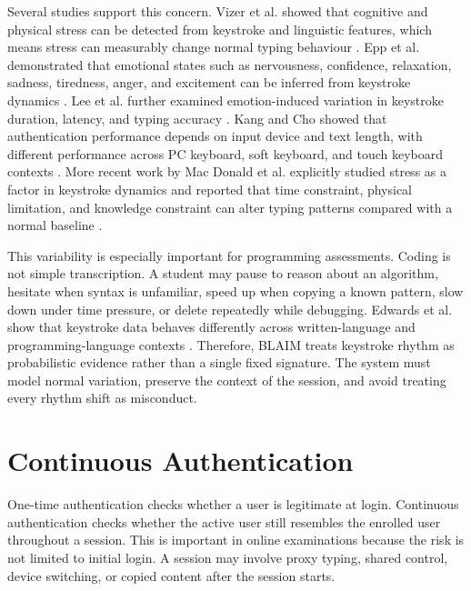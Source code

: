 Several studies support this concern. Vizer et al. showed that cognitive and physical stress can be detected from keystroke and linguistic features, which means stress can measurably change normal typing behaviour \cite{vizer2009stress}. Epp et al. demonstrated that emotional states such as nervousness, confidence, relaxation, sadness, tiredness, anger, and excitement can be inferred from keystroke dynamics \cite{epp2011emotional}. Lee et al. further examined emotion-induced variation in keystroke duration, latency, and typing accuracy \cite{lee2014emotion}. Kang and Cho showed that authentication performance depends on input device and text length, with different performance across PC keyboard, soft keyboard, and touch keyboard contexts \cite{kang2015inputdevices}. More recent work by Mac Donald et al. explicitly studied stress as a factor in keystroke dynamics and reported that time constraint, physical limitation, and knowledge constraint can alter typing patterns compared with a normal baseline \cite{macdonald2026stress}.

This variability is especially important for programming assessments. Coding is not simple transcription. A student may pause to reason about an algorithm, hesitate when syntax is unfamiliar, speed up when copying a known pattern, slow down under time pressure, or delete repeatedly while debugging. Edwards et al. show that keystroke data behaves differently across written-language and programming-language contexts \cite{edwards2020keystroke}. Therefore, BLAIM treats keystroke rhythm as probabilistic evidence rather than a single fixed signature. The system must model normal variation, preserve the context of the session, and avoid treating every rhythm shift as misconduct.

\section{Continuous Authentication}
\label{sec:lit-continuous-auth}

One-time authentication checks whether a user is legitimate at login. Continuous authentication checks whether the active user still resembles the enrolled user throughout a session. This is important in online examinations because the risk is not limited to initial login. A session may involve proxy typing, shared control, device switching, or copied content after the session starts.

